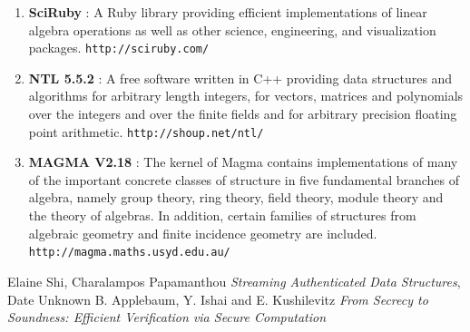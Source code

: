 \documentclass[11pt, letterpaper, oneside]{article}
\begin{document}
	\begin{enumerate}
	\item \textbf{SciRuby} : A Ruby library providing efficient implementations of linear algebra operations as well as other science, engineering, and visualization packages. \texttt{http://sciruby.com/}
	\item \textbf{NTL 5.5.2} : A free software written in C++ providing data structures and algorithms for arbitrary length integers, for vectors, matrices and polynomials over the integers and over the finite fields and for arbitrary precision floating point arithmetic. \texttt{http://shoup.net/ntl/}
	\item \textbf{MAGMA V2.18} : The kernel of Magma contains implementations of many of the important concrete classes of structure in five fundamental branches of algebra, namely group theory, ring theory, field theory, module theory and the theory of algebras.
	In addition, certain families of structures from algebraic geometry and finite incidence geometry are included. \texttt{http://magma.maths.usyd.edu.au/}
	\end{enumerate}

	



\begin{thebibliography}{9}
	 Elaine Shi, Charalampos Papamanthou \emph{Streaming Authenticated Data Structures}, Date Unknown
	 B. Applebaum, Y. Ishai
and E. Kushilevitz \emph{From Secrecy to Soundness:
Efficient Verification via Secure Computation}
	\end{thebibliography}
\end{document}

